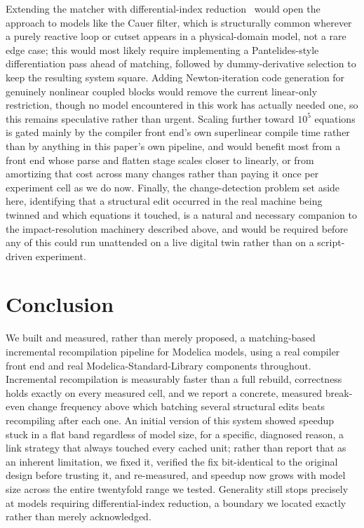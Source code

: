 \documentclass[journal]{IEEEtran}
\begin{document}
Extending the matcher with differential-index reduction~\cite{pantelides1988consistent} would open the approach to models like the Cauer filter, which is structurally common wherever a purely reactive loop or cutset appears in a physical-domain model, not a rare edge case; this would most likely require implementing a Pantelides-style differentiation pass ahead of matching, followed by dummy-derivative selection to keep the resulting system square. Adding Newton-iteration code generation for genuinely nonlinear coupled blocks would remove the current linear-only restriction, though no model encountered in this work has actually needed one, so this remains speculative rather than urgent. Scaling further toward $10^5$ equations is gated mainly by the compiler front end's own superlinear compile time rather than by anything in this paper's own pipeline, and would benefit most from a front end whose parse and flatten stage scales closer to linearly, or from amortizing that cost across many changes rather than paying it once per experiment cell as we do now. Finally, the change-detection problem set aside here, identifying that a structural edit occurred in the real machine being twinned and which equations it touched, is a natural and necessary companion to the impact-resolution machinery described above, and would be required before any of this could run unattended on a live digital twin rather than on a script-driven experiment.

\section{Conclusion}
\label{sec:conclusion}

We built and measured, rather than merely proposed, a matching-based incremental recompilation pipeline for Modelica models, using a real compiler front end and real Modelica-Standard-Library components throughout. Incremental recompilation is measurably faster than a full rebuild, correctness holds exactly on every measured cell, and we report a concrete, measured break-even change frequency above which batching several structural edits beats recompiling after each one. An initial version of this system showed speedup stuck in a flat band regardless of model size, for a specific, diagnosed reason, a link strategy that always touched every cached unit; rather than report that as an inherent limitation, we fixed it, verified the fix bit-identical to the original design before trusting it, and re-measured, and speedup now grows with model size across the entire twentyfold range we tested. Generality still stops precisely at models requiring differential-index reduction, a boundary we located exactly rather than merely acknowledged.
\end{document}
